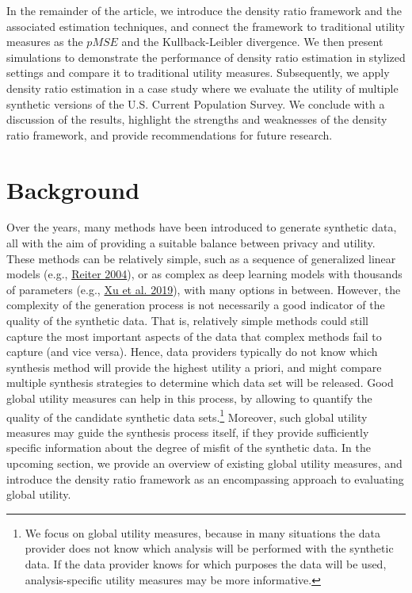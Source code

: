 \documentclass[
]{article}
\begin{document}
In the remainder of the article, we introduce the density ratio
framework and the associated estimation techniques, and connect the
framework to traditional utility measures as the \(pMSE\) and the
Kullback-Leibler divergence. We then present simulations to demonstrate
the performance of density ratio estimation in stylized settings and
compare it to traditional utility measures. Subsequently, we apply
density ratio estimation in a case study where we evaluate the utility
of multiple synthetic versions of the U.S. Current Population Survey. We
conclude with a discussion of the results, highlight the strengths and
weaknesses of the density ratio framework, and provide recommendations
for future research.

\hypertarget{background}{%
\section{Background}\label{background}}

Over the years, many methods have been introduced to generate synthetic
data, all with the aim of providing a suitable balance between privacy
and utility. These methods can be relatively simple, such as a sequence
of generalized linear models (e.g.,
\protect\hyperlink{ref-reiter_releasing_2004}{Reiter 2004}), or as
complex as deep learning models with thousands of parameters (e.g.,
\protect\hyperlink{ref-xu_ctgan_2019}{Xu et al. 2019}), with many
options in between. However, the complexity of the generation process is
not necessarily a good indicator of the quality of the synthetic data.
That is, relatively simple methods could still capture the most
important aspects of the data that complex methods fail to capture (and
vice versa). Hence, data providers typically do not know which synthesis
method will provide the highest utility a priori, and might compare
multiple synthesis strategies to determine which data set will be
released. Good global utility measures can help in this process, by
allowing to quantify the quality of the candidate synthetic data
sets.\footnote{We focus on global utility measures, because in many
  situations the data provider does not know which analysis will be
  performed with the synthetic data. If the data provider knows for
  which purposes the data will be used, analysis-specific utility
  measures may be more informative.} Moreover, such global utility
measures may guide the synthesis process itself, if they provide
sufficiently specific information about the degree of misfit of the
synthetic data. In the upcoming section, we provide an overview of
existing global utility measures, and introduce the density ratio
framework as an encompassing approach to evaluating global utility.
\end{document}
